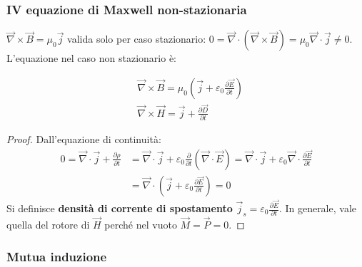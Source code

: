\documentclass[a4paper]{scrartcl}
\numberwithin{equation}{subsection}
\theoremstyle{style1}
\newenvironment{boxenv}[1][]{
    \begin{eqbox}[#1]
    }{
   \end{eqbox}
}
\begin{document}
\subsubsection{IV equazione di Maxwell non-stazionaria}

$\vec{\nabla }\times \vec{B} = \mu_0 \vec{j}$ valida solo per caso stazionario: $0=\vec{\nabla }\cdot (\vec{\nabla }\times \vec{B}) = \mu_0 \vec{\nabla }\cdot \vec{j}\neq 0$. L'equazione nel caso non stazionario \`e:

\begin{equation}
	\begin{split}
		&\vec{\nabla }\times \vec{B} = \mu_0 \left(\vec{j}+\varepsilon _0 \frac{\partial \vec{E}}{\partial t} \right) \\
		&\vec{\nabla }\times \vec{H} = \vec{j}+\frac{\partial \vec{D}}{\partial t} 
	\end{split} 
\end{equation}
\begin{boxenv}[]
\begin{proof}
	Dall'equazione di continuit\`a:
	\[
	\begin{split}
		0=\vec{\nabla }\cdot \vec{j} + \frac{\partial \rho }{\partial t}  &= \vec{\nabla }\cdot \vec{j}+\varepsilon _0 \frac{\partial }{\partial t} (\vec{\nabla }\cdot \vec{E}) = \vec{\nabla }\cdot \vec{j}+ \varepsilon _0 \vec{\nabla }\cdot \frac{\partial \vec{E}}{\partial t} \\
										&=\vec{\nabla }\cdot \left(\vec{j} + \varepsilon _0\frac{\partial \vec{E}}{\partial t} \right) =0
	\end{split}
	\] 
	Si definisce \textbf{densit\`a di corrente di spostamento} $\vec{j}_s = \varepsilon _0 \frac{\partial \vec{E}}{\partial t} $. In generale, vale quella del rotore di $\vec{H}$ perch\'e nel vuoto $\vec{M} = \vec{P} = 0 $.
\end{proof}
\end{boxenv}
\subsubsection{Mutua induzione}
\end{document}
